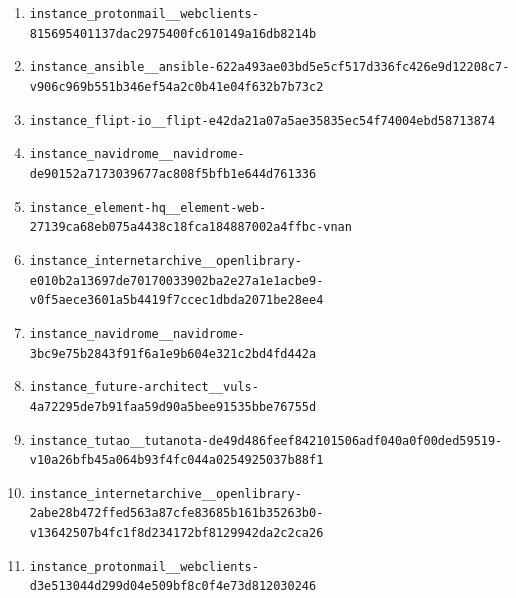 \begin{enumerate}
\item \texttt{instance\_\allowbreak{}protonmail\_\allowbreak{}\_\allowbreak{}webclients-\allowbreak{}815695401137da\allowbreak{}c2975400fc6101\allowbreak{}49a16db8214b}
\item \texttt{instance\_\allowbreak{}ansible\_\allowbreak{}\_\allowbreak{}ansible-\allowbreak{}622a493ae03bd5\allowbreak{}e5cf517d336fc4\allowbreak{}26e9d12208c7-\allowbreak{}v906c969b551b3\allowbreak{}46ef54a2c0b41e\allowbreak{}04f632b7b73c2}
\item \texttt{instance\_\allowbreak{}flipt-\allowbreak{}io\_\allowbreak{}\_\allowbreak{}flipt-\allowbreak{}e42da21a07a5ae\allowbreak{}35835ec54f7400\allowbreak{}4ebd58713874}
\item \texttt{instance\_\allowbreak{}navidrome\_\allowbreak{}\_\allowbreak{}navidrome-\allowbreak{}de90152a717303\allowbreak{}9677ac808f5bfb\allowbreak{}1e644d761336}
\item \texttt{instance\_\allowbreak{}element-\allowbreak{}hq\_\allowbreak{}\_\allowbreak{}element-\allowbreak{}web-\allowbreak{}27139ca68eb075\allowbreak{}a4438c18fca184\allowbreak{}887002a4ffbc-\allowbreak{}vnan}
\item \texttt{instance\_\allowbreak{}internetarchiv\allowbreak{}e\_\allowbreak{}\_\allowbreak{}openlibrary-\allowbreak{}e010b2a13697de\allowbreak{}70170033902ba2\allowbreak{}e27a1e1acbe9-\allowbreak{}v0f5aece3601a5\allowbreak{}b4419f7ccec1db\allowbreak{}da2071be28ee4}
\item \texttt{instance\_\allowbreak{}navidrome\_\allowbreak{}\_\allowbreak{}navidrome-\allowbreak{}3bc9e75b2843f9\allowbreak{}1f6a1e9b604e32\allowbreak{}1c2bd4fd442a}
\item \texttt{instance\_\allowbreak{}future-\allowbreak{}architect\_\allowbreak{}\_\allowbreak{}vuls-\allowbreak{}4a72295de7b91f\allowbreak{}aa59d90a5bee91\allowbreak{}535bbe76755d}
\item \texttt{instance\_\allowbreak{}tutao\_\allowbreak{}\_\allowbreak{}tutanota-\allowbreak{}de49d486feef84\allowbreak{}2101506adf040a\allowbreak{}0f00ded59519-\allowbreak{}v10a26bfb45a06\allowbreak{}4b93f4fc044a02\allowbreak{}54925037b88f1}
\item \texttt{instance\_\allowbreak{}internetarchiv\allowbreak{}e\_\allowbreak{}\_\allowbreak{}openlibrary-\allowbreak{}2abe28b472ffed\allowbreak{}563a87cfe83685\allowbreak{}b161b35263b0-\allowbreak{}v13642507b4fc1\allowbreak{}f8d234172bf812\allowbreak{}9942da2c2ca26}
\item \texttt{instance\_\allowbreak{}protonmail\_\allowbreak{}\_\allowbreak{}webclients-\allowbreak{}d3e513044d299d\allowbreak{}04e509bf8c0f4e\allowbreak{}73d812030246}

\end{enumerate}
